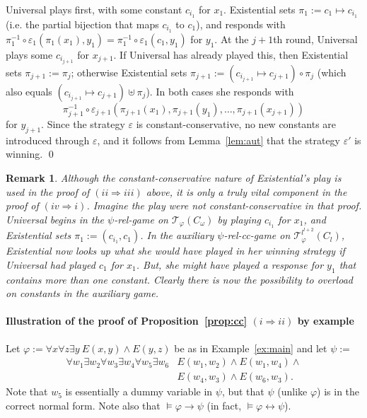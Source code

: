 \documentclass{LMCS}
\newtheorem*{remark}{Remark}
\begin{document}
Universal plays first, with some constant $c_{i_1}$ for $x_1$. Existential sets $\pi_1:=c_1\mapsto c_{i_1}$ (i.e. the partial bijection that maps $c_{i_1}$ to $c_{1}$), and responds with $\pi^{-1}_1 \circ \varepsilon_1(\pi_1(x_1),y_1)=\pi^{-1}_1 \circ \varepsilon_1(c_1,y_1)$ for $y_1$. At the $j+1$th round, Universal plays some $c_{i_{j+1}}$ for $x_{j+1}$. If Universal has already played this, then Existential sets $\pi_{j+1}:=\pi_j$; otherwise Existential sets $\pi_{j+1}:=(c_{i_{j+1}} \mapsto c_{j+1}) \circ \pi_j $ (which also equals $(c_{i_{j+1}} \mapsto c_{j+1}) \uplus \pi_j$). In both cases she responds with 
\[ \pi^{-1}_{j+1} \circ \varepsilon_{j+1}(\pi_{j+1}(x_1),\pi_{j+1}(y_1),\ldots,\pi_{j+1}(x_{j+1})) \]
for $y_{j+1}$.
Since the strategy $\varepsilon$ is constant-conservative, no new constants are introduced through $\varepsilon$, and it follows from Lemma~\ref{lem:aut} that the strategy $\varepsilon'$ is winning.
\qed
\begin{remark}
Although the constant-conservative nature of Existential's play is used in the proof of $(ii \Rightarrow iii)$ above, it is only a truly vital component in the proof of $(iv \Rightarrow i)$. Imagine the play were not constant-conservative in that proof. Universal begins in the $\psi$-rel-game on $\mathcal{T}_\varphi(C_\omega)$ by playing $c_{i_1}$ for $x_1$, and Existential sets $\pi_1:=(c_{i_1},c_1)$. In the auxiliary $\psi$-rel-cc-game on $\mathcal{T}^{l^{l+2}}_\varphi(C_l)$, Existential now looks up what she would have played in her winning strategy if Universal had played $c_1$ for $x_1$. But, she might have played a response for $y_1$ that contains more than one constant. Clearly there is now the possibility to overload on constants in the auxiliary game.
\end{remark}

\paragraph{Illustration of the proof of Proposition~\ref{prop:cc} $(i \Rightarrow ii)$ by example}
Let $\varphi:=\forall x \forall z \exists y \ E(x,y) \wedge E(y,z)$ be as in Example~\ref{ex:main} and let $\psi :=$ 
\[
\begin{array}{ll}
\forall w_1 \exists w_2 \forall w_3 \exists w_4 \forall w_5 \exists w_6 & E(w_1,w_2) \wedge E(w_1,w_4) \wedge \\
& E(w_4,w_3) \wedge E(w_6,w_3). 
\end{array}
\]
Note that $w_5$ is essentially a dummy variable in $\psi$, but that $\psi$ (unlike $\varphi$) is in the correct normal form. Note also that $\models \varphi \rightarrow \psi$ (in fact, $\models \varphi \leftrightarrow \psi$).
\end{document}
